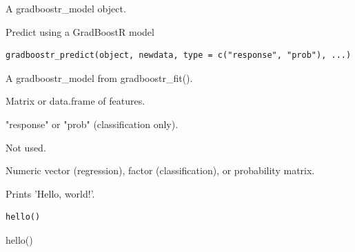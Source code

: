 \documentclass[a4paper]{book}
\begin{document}
%
\begin{Value}
A gradboostr\_model object.
\end{Value}
%
\begin{Description}
Predict using a GradBoostR model
\end{Description}
%
\begin{Usage}
\begin{verbatim}
gradboostr_predict(object, newdata, type = c("response", "prob"), ...)
\end{verbatim}
\end{Usage}
%
\begin{Arguments}
\begin{ldescription}
\item[\code{object}] A gradboostr\_model from gradboostr\_fit().

\item[\code{newdata}] Matrix or data.frame of features.

\item[\code{type}] "response" or "prob" (classification only).

\item[\code{...}] Not used.
\end{ldescription}
\end{Arguments}
%
\begin{Value}
Numeric vector (regression), factor (classification), or probability matrix.
\end{Value}
%
\begin{Description}
Prints 'Hello, world!'.
\end{Description}
%
\begin{Usage}
\begin{verbatim}
hello()
\end{verbatim}
\end{Usage}
%
\begin{Examples}
\begin{ExampleCode}
hello()
\end{ExampleCode}
\end{Examples}
\printindex{}
\end{document}
